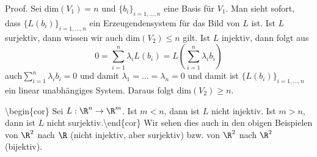 \documentclass[letterpaper,10pt,english]{jupyterBook}
\begin{document}
\begin{emphBox}{}{}
Proof.  Sei dim\((V_1)=n\) und \(\{b_i\}_{i=1,\ldots,n}\) eine Basis für \(V_1\). Man sieht sofort, dass \(\{L(b_i)\}_{i=1,\ldots,n}\) ein Erzeugendensystem für das Bild von \(L\) ist. Ist \(L\) surjektiv, dann wissen wir auch dim\((V_2) \leq n\) gilt. Ist \(L\) injektiv, dann folgt aus
\begin{equation*}
 0 = \sum_{i=1}^n \lambda_i L(b_i) = L( \sum_{i=1}^n \lambda_i b_i)
\end{equation*}
auch\(\sum_{i=1}^n \lambda_i b_i = 0\) und damit \(\lambda_1=\ldots=\lambda_n = 0\) und damit ist \(\{L(b_i)\}_{i=1,\ldots,n}\) ein linear unabhängiges System. Daraus folgt dim\((V_2) \geq n\).
\end{emphBox}

\textbackslash{}begin\{cor\}
Sei \(L: \R^n \rightarrow \R^m\). Ist \(m < n\), dann ist \(L\) nicht injektiv. Ist \(m> n\), dann ist \(L\) nicht surjektiv.\textbackslash{}end\{cor\}
Wir sehen dies auch in den obigen Beispielen von \(\R^2\) nach  \(\R\) (nicht injektiv, aber surjektiv) bzw. von \(\R^2\) nach \(\R^2\) (bijektiv).
\end{document}
